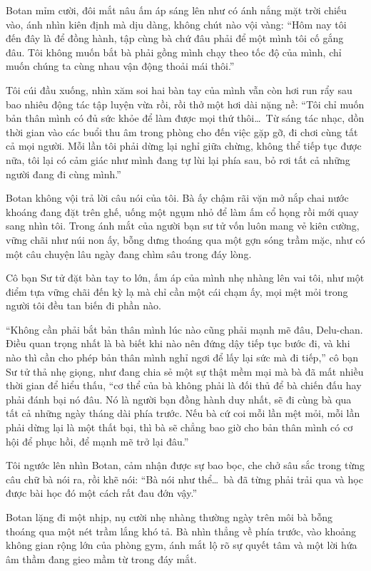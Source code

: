 \documentclass[../main.tex]{subfiles}
\begin{document}
Botan mỉm cười, đôi mắt nâu ấm áp sáng lên như có ánh nắng mặt trời chiếu vào, ánh nhìn kiên định mà dịu dàng, không chút nào vội vàng: ``Hôm nay tôi đến đây là để đồng hành, tập cùng bà chứ đâu phải để một mình tôi cố gắng đâu. Tôi không muốn bắt bà phải gồng mình chạy theo tốc độ của mình, chỉ muốn chúng ta cùng nhau vận động thoải mái thôi.''

Tôi cúi đầu xuống, nhìn xăm soi hai bàn tay của mình vẫn còn hơi run rẩy sau bao nhiêu động tác tập luyện vừa rồi, rồi thở một hơi dài nặng nề: ``Tôi chỉ muốn bản thân mình có đủ sức khỏe để làm được mọi thứ thôi\dots\ Từ sáng tác nhạc, dồn thời gian vào các buổi thu âm trong phòng cho đến việc gặp gỡ, đi chơi cùng tất cả mọi người. Mỗi lần tôi phải dừng lại nghỉ giữa chừng, không thể tiếp tục được nữa, tôi lại có cảm giác như mình đang tự lùi lại phía sau, bỏ rơi tất cả những người đang đi cùng mình.''

Botan không vội trả lời câu nói của tôi. Bà ấy chậm rãi vặn mở nắp chai nước khoáng đang đặt trên ghế, uống một ngụm nhỏ để làm ấm cổ họng rồi mới quay sang nhìn tôi. Trong ánh mắt của người bạn sư tử vốn luôn mang vẻ kiên cường, vững chãi như núi non ấy, bỗng dưng thoáng qua một gợn sóng trầm mặc, như có một câu chuyện lâu ngày đang chìm sâu trong đáy lòng.

Cô bạn Sư tử đặt bàn tay to lớn, ấm áp của mình nhẹ nhàng lên vai tôi, như một điểm tựa vững chãi đến kỳ lạ mà chỉ cần một cái chạm ấy, mọi mệt mỏi trong người tôi đều tan biến đi phần nào.

``Không cần phải bắt bản thân mình lúc nào cũng phải mạnh mẽ đâu, Delu-chan. Điều quan trọng nhất là bà biết khi nào nên đứng dậy tiếp tục bước đi, và khi nào thì cần cho phép bản thân mình nghỉ ngơi để lấy lại sức mà đi tiếp,'' cô bạn Sư tử thả nhẹ giọng, như đang chia sẻ một sự thật mềm mại mà bà đã mất nhiều thời gian để hiểu thấu, ``cơ thể của bà không phải là đối thủ để bà chiến đấu hay phải đánh bại nó đâu. Nó là người bạn đồng hành duy nhất, sẽ đi cùng bà qua tất cả những ngày tháng dài phía trước. Nếu bà cứ coi mỗi lần mệt mỏi, mỗi lần phải dừng lại là một thất bại, thì bà sẽ chẳng bao giờ cho bản thân mình có cơ hội để phục hồi, để mạnh mẽ trở lại đâu.''

Tôi ngước lên nhìn Botan, cảm nhận được sự bao bọc, che chở sâu sắc trong từng câu chữ bà nói ra, rồi khẽ nói: ``Bà nói như thể\dots\ bà đã từng phải trải qua và học được bài học đó một cách rất đau đớn vậy.''

Botan lặng đi một nhịp, nụ cười nhẹ nhàng thường ngày trên môi bà bỗng thoáng qua một nét trầm lắng khó tả. Bà nhìn thẳng về phía trước, vào khoảng không gian rộng lớn của phòng gym, ánh mắt lộ rõ sự quyết tâm và một lời hứa âm thầm đang gieo mầm từ trong đáy mắt.
\end{document}
